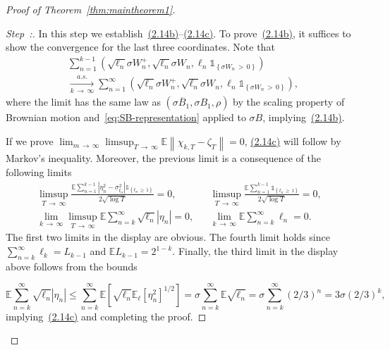 \documentclass[10pt]{amsart}
\theoremstyle{definition}\newtheorem{defi}[theo]{Definition}\newtheorem{rema}[theo]{Remark}\newtheorem{exam}[theo]{Example}\newtheorem{exem}[theo]{Example}\newtheorem{nota}[theo]{Notation}
\newcommand\E{\mathds{E}}
\newcommand\1{\mathds{1}}
\newcommand\ov[1]{\overline{#1}}
\newcounter{stepcount}
\newenvironment{step}{\refstepcounter{stepcount}\begin{proof}[Step~\thestepcount:]}{\let\qed\relax\end{proof}}
\begin{document}
\begin{proof}[Proof of Theorem~\ref{thm:maintheorem1}]
\begin{step}\label{proof-theo1.1-step3}
In this step we establish~\hyperref[eq:quintuple-Billingsley]{(2.14b)}--\hyperref[eq:quintuple-Billingsley]{(2.14c)}. To prove~\hyperref[eq:quintuple-Billingsley]{(2.14b)}, it suffices to show the convergence for the last three coordinates. Note that
\begin{multline*}
\sum_{n=1}^{k-1}\left(\sqrt{\ell_n}\sigma W_n^+, \sqrt{\ell_n}\sigma W_n, \ell_n\1_{\left\{\sigma W_n\,>\,0\right\}}\right)\\
\xrightarrow[k\,\to\,\infty]{a.s.}
\sum_{n=1}^\infty\left(\sqrt{\ell_n}\sigma W_n^+, \sqrt{\ell_n}\sigma W_n, \ell_n\1_{\left\{\sigma W_n\,>\,0\right\}}\right),
\end{multline*}
where the limit has the same law as $(\sigma \ov B_1,\sigma B_1,\rho)$ by the scaling property of Brownian motion and~\eqref{eq:SB-representation} applied to $\sigma B$, implying~\hyperref[eq:quintuple-Billingsley]{(2.14b)}.

If we prove $\lim_{m\,\to\,\infty}\limsup_{T\,\to\,\infty} \E\left\|\chi_{k,T}-\zeta_T\right\|=0$, \hyperref[eq:quintuple-Billingsley]{(2.14c)} will follow by Markov's inequality. Moreover, the previous limit is a consequence of the following limits
\begin{align*}
\limsup_{T\,\to\,\infty}\frac{\E\sum\limits_{n=1}^{k-1}\left|\eta_n^2-\sigma_{t_n}^2\right|\1_{\left\{t_n\,\ge\,1\right\}}}{2\sqrt{\log T}} =0,&&
\limsup_{T\,\to\,\infty}\frac{\E\sum\limits_{n=1}^{k-1} \1_{\left\{t_n\,\ge\,1\right\}}}{2\sqrt{\log T}} =0,&\\
\lim_{k\,\to\,\infty}\limsup_{T\,\to\,\infty}\E\sum_{n=k}^\infty\sqrt{\ell_n}\left|\eta_n\right| =0,&&
\lim_{k\,\to\,\infty}\E\sum_{n=k}^\infty\ell_n =0.&
\end{align*}
The first two limits in the display are obvious. The fourth limit holds since $\sum_{n=k}^\infty\ell_k=L_{k-1}$ and $\E L_{k-1}=2^{1-k}$. Finally, the third limit in the display above follows from the bounds

\[
\E\sum_{n=k}^\infty\sqrt{\ell_n}|\eta_n|
\le\sum_{n=k}^\infty\E\left[\sqrt{\ell_n}\E_\ell\left[\eta_n^2\right]^{1/2}\right] =\sigma\sum_{n=k}^\infty\E\sqrt{\ell_n} =\sigma\sum_{n=k}^\infty(2/3)^n =3\sigma (2/3)^{k},
\]
implying~\hyperref[eq:quintuple-Billingsley]{(2.14c)} and completing the proof.
\end{step}
\end{proof}
\end{document}

